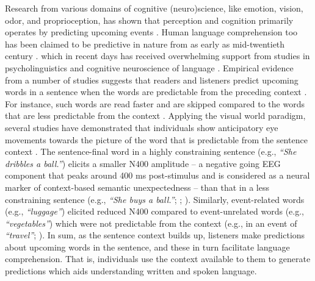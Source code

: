 \documentclass[a4paper, nobind]{templates/ociamthesis}
\begin{document}
Research from various domains of cognitive (neuro)science, like emotion, vision, odor, and proprioception, has shown that perception and cognition primarily operates by predicting upcoming events \autocite{Stadler2012,Clark2013,Seth2013,Marques2018}.
Human language comprehension too has been claimed to be predictive in nature from as early as mid-twentieth century \autocites[e.g.,][]{Miller1951,Mccullough1958,Morton1964}.
which in recent days has received overwhelming support from studies in psycholinguistics and cognitive neuroscience of language \autocites{Delong2005,Lupyan2015,Pickering2018}[cf.][]{Huettig2016}.
Empirical evidence from a number of studies suggests that readers and listeners predict upcoming words in a sentence when the words are predictable from the preceding context \autocites[for reviews][]{Staub2015,Kuperberg2016}.
For instance, such words are read faster and are skipped compared to the words that are less predictable from the context \autocite{Ehrlich1981,Frisson2005,Staub2011}.
Applying the visual world paradigm, several studies have demonstrated that individuals show anticipatory eye movements towards the picture of the word that is predictable from the sentence context \autocite{Altmann1999,Kamide2003,Ankener2018}.
The sentence-final word in a highly constraining sentence (e.g., \emph{``She dribbles a ball.''}) elicits a smaller N400 amplitude -- a negative going EEG component that peaks around 400 ms post-stimulus and is considered as a neural marker of context-based semantic unexpectedness \autocite{Kutas2011} -- than that in a less constraining sentence (e.g., \emph{``She buys a ball.''}; \textcite{Kutas1984}; \textcite{Federmeier2007}).
Similarly, event-related words (e.g., \emph{``luggage''}) elicited reduced N400 compared to event-unrelated words (e.g., \emph{``vegetables''}) which were not predictable from the context (e.g., in an event of \emph{``travel''}; \textcite{Metusalem2012}).
In sum, as the sentence context builds up, listeners make predictions about upcoming words in the sentence, and these in turn facilitate language comprehension.
That is, individuals use the context available to them to generate predictions which aids understanding written and spoken language.
\end{document}
